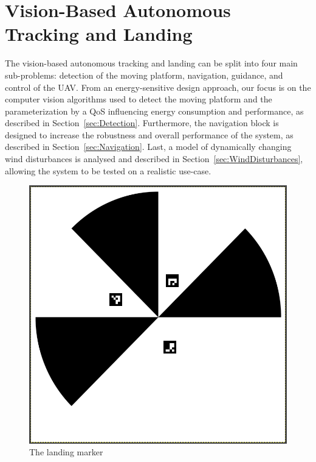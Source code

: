 \documentclass[conference, onecolumn, draftclsnofoot]{IEEEtran}
\begin{document}
\section{Vision-Based Autonomous Tracking and Landing}
\label{sec:landing}

The vision-based autonomous tracking and landing can be split into
four main sub-problems: detection of the moving platform, navigation,
guidance, and control of the UAV. From an energy-sensitive design
approach, our focus is on the computer vision algorithms used to
detect the moving platform and the parameterization by a QoS
influencing energy consumption and performance, as described in
Section~\ref{sec:Detection}. Furthermore, the navigation block is
designed to increase the robustness and overall performance of the
system, as described in Section~\ref{sec:Navigation}. Last, a model of
dynamically changing wind disturbances is analysed and described in
Section~\ref{sec:WindDisturbances}, allowing the system to be tested
on a realistic use-case.


\begin{figure}
\centering
\includegraphics[scale=0.15]{n-fold-for-landing.png}
\caption{The landing marker}
\label{fig:LandingMarker}
\end{figure}
\end{document}
